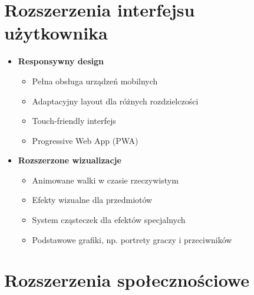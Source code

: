 \section{Rozszerzenia interfejsu użytkownika}

\begin{itemize}
    \item \textbf{Responsywny design}
    \begin{itemize}
        \item Pełna obsługa urządzeń mobilnych
        \item Adaptacyjny layout dla różnych rozdzielczości
        \item Touch-friendly interfejs
        \item Progressive Web App (PWA)
    \end{itemize}

    \item \textbf{Rozszerzone wizualizacje}
    \begin{itemize}
        \item Animowane walki w czasie rzeczywistym
        \item Efekty wizualne dla przedmiotów
        \item System cząsteczek dla efektów specjalnych
        \item Podstawowe grafiki, np. portrety graczy i przeciwników
    \end{itemize}
\end{itemize}

\section{Rozszerzenia społecznościowe}

